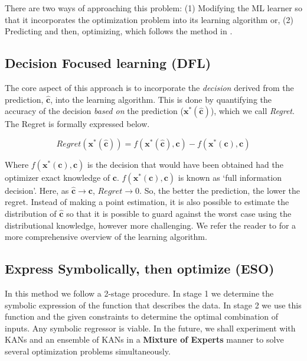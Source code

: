 \documentclass[12pt, letterpaper]{article}
\begin{document}
There are two ways of approaching this problem: (1) Modifying the ML learner so
that it incorporates the optimization problem into its learning algorithm or,
(2) Predicting and then, optimizing, which follows the method in \cite{spo}.

\subsection{Decision Focused learning (DFL)}
The core aspect of this approach is to incorporate the \textit{decision} derived
from the prediction, $\hat{\mathbf{c}}$,  into the learning algorithm. This is
done by quantifying the accuracy of the decision \textit{based on} the
prediction ($\mathbf{x}^*(\hat{\mathbf{c}})$), which we call \textit{Regret}.
The Regret is formally expressed below.

\begin{equation}
    Regret(\mathbf{x}^*(\hat{\mathbf{c}})) = f(\mathbf{x}^*(\hat{\mathbf{c}}), \mathbf{c}) - f(\mathbf{x}^*(\mathbf{c}), \mathbf{c})
\end{equation}

Where $f(\mathbf{x}^*(\mathbf{c}), \mathbf{c})$ is the decision that would have
been obtained had the optimizer exact knowledge of $\mathbf{c}$.
$f(\mathbf{x}^*(\mathbf{c}), \mathbf{c})$ is known as `full information
decision'. Here, as $\hat{\mathbf{c}} \rightarrow \mathbf{c}$, $Regret
\rightarrow 0$. So, the better the prediction, the lower the regret. Instead of
making a point estimation, it is also possible to estimate the distribution of
$\hat{\mathbf{c}}$ so that it is possible to guard against the worst case using
the distributional knowledge, however more challenging. We refer the reader to
\cite{Mandi_2024} for a more comprehensive overview of the learning algorithm.

\subsection{Express Symbolically, then optimize (ESO)}
In this method we follow a 2-stage procedure. In stage 1 we determine the
symbolic expression of the function that describes the data. In stage 2 we use
this function and the given constraints to determine the optimal combination of
inputs. Any symbolic regressor is viable. In the future, we shall experiment
with KANs and an ensemble of KANs in a \textbf{Mixture of Experts}
\cite{masoudnia_mixture_2014} manner to solve several optimization problems
simultaneously.
\end{document}
